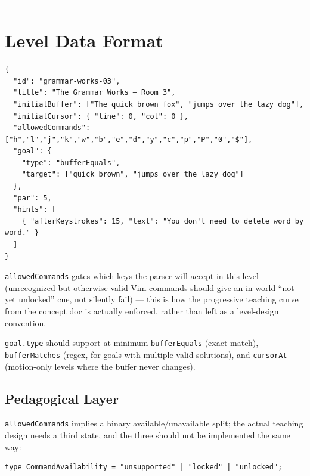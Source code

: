 \documentclass[11pt]{article}
\begin{document}
\begin{center}\rule{0.5\linewidth}{0.5pt}\end{center}

\hypertarget{sec-level-data-format}{%
\section{Level Data Format}\label{sec-level-data-format}}

\begin{Verbatim}[breaklines=true, breakanywhere=true, fontsize=\small]
{
  "id": "grammar-works-03",
  "title": "The Grammar Works — Room 3",
  "initialBuffer": ["The quick brown fox", "jumps over the lazy dog"],
  "initialCursor": { "line": 0, "col": 0 },
  "allowedCommands": ["h","l","j","k","w","b","e","d","y","c","p","P","0","$"],
  "goal": {
    "type": "bufferEquals",
    "target": ["quick brown", "jumps over the lazy dog"]
  },
  "par": 5,
  "hints": [
    { "afterKeystrokes": 15, "text": "You don't need to delete word by word." }
  ]
}
\end{Verbatim}

\texttt{allowedCommands} gates which keys the parser will accept in this level
(unrecognized-but-otherwise-valid Vim commands should give an in-world
``not yet unlocked'' cue, not silently fail) --- this is how the progressive
teaching curve from the concept doc is actually enforced, rather than left
as a level-design convention.

\texttt{goal.type} should support at minimum \texttt{bufferEquals} (exact match),
\texttt{bufferMatches} (regex, for goals with multiple valid solutions), and
\texttt{cursorAt} (motion-only levels where the buffer never changes).

\hypertarget{sec-pedagogical-layer}{%
\subsection{Pedagogical Layer}\label{sec-pedagogical-layer}}

\texttt{allowedCommands} implies a binary available/unavailable split; the actual
teaching design needs a third state, and the three should not be
implemented the same way:

\begin{Verbatim}[breaklines=true, breakanywhere=true, fontsize=\small]
type CommandAvailability = "unsupported" | "locked" | "unlocked";
\end{Verbatim}
\end{document}
